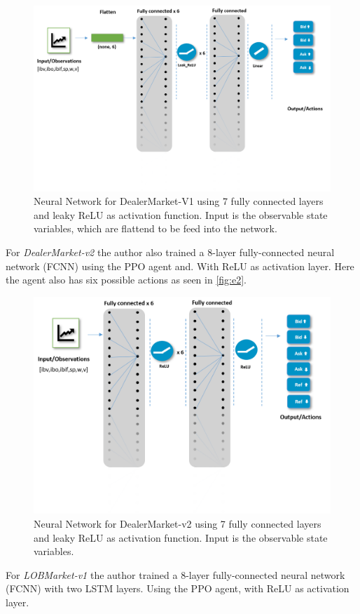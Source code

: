 \documentclass{kththesis}
\theoremstyle{definition}
\begin{document}
\begin{figure}[H]
    \centering
    \includegraphics[scale=.5]{Imgs/nnadmv0.png}
    \caption{Neural Network for DealerMarket-V1 using 7 fully connected layers and leaky ReLU as activation function. Input is the observable state variables, which are flattend to be feed into the network.}
    \label{fig:e1}
\end{figure}
For \textit{DealerMarket-v2} the author also trained a 8-layer fully-connected neural network (FCNN) using the PPO agent and. With ReLU as activation layer. Here the agent also has six possible actions as seen in \autoref{fig:e2}. 

\begin{figure}[H]
    \centering
    \includegraphics[scale=.5]{Imgs/nnadmv1.png}
    \caption{Neural Network for DealerMarket-v2 using 7 fully connected layers and leaky ReLU as activation function. Input is the observable state variables.}
    \label{fig:e2}
\end{figure}
For \textit{LOBMarket-v1} the author trained a 8-layer fully-connected neural network (FCNN) with two LSTM layers. Using the PPO agent, with ReLU as activation layer.
\end{document}
